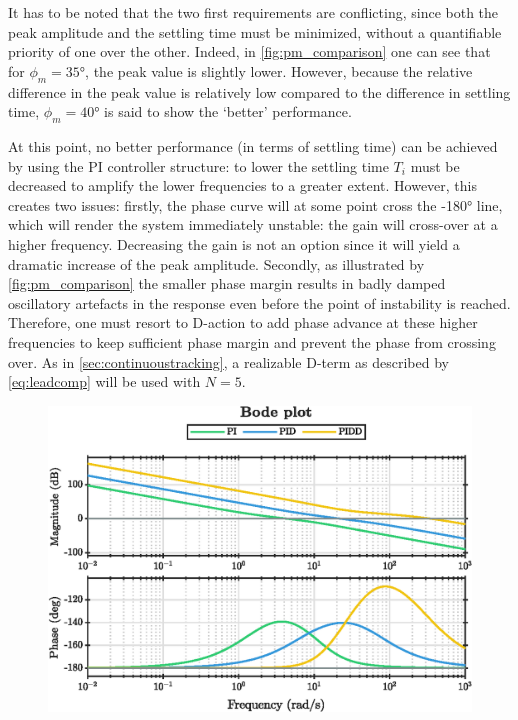 It has to be noted that the two first requirements are conflicting, since both the peak amplitude and the settling time must be minimized, without a quantifiable priority of one over the other. Indeed, in \cref{fig:pm_comparison} one can see that for $\phi_m = \ang{35}$, the peak value is slightly lower. However, because the relative difference in the peak value is relatively low compared to the difference in settling time, $\phi_m = \ang{40}$ is said to show the `better' performance.

At this point, no better performance (in terms of settling time) can be achieved by using the PI controller structure: to lower the settling time $T_i$ must be decreased to amplify the lower frequencies to a greater extent. However, this creates two issues: firstly, the phase curve will at some point cross the \ang{-180} line, which will render the system immediately unstable: the gain will cross-over at a higher frequency. Decreasing the gain is not an option since it will yield a dramatic increase of the peak amplitude. Secondly, as illustrated by \cref{fig:pm_comparison} the smaller phase margin results in badly damped oscillatory artefacts in the response even before the point of instability is reached. Therefore, one must resort to D-action to add phase advance at these higher frequencies to keep sufficient phase margin and prevent the phase from crossing over. As in \cref{sec:continuoustracking}, a realizable D-term as described by \cref{eq:leadcomp} will be used with $N = 5$. 
\begin{figure}[ht]
    \centering
    \includegraphics[]{media/q2/pi_bode_comparison.eps}
    \caption{}
    \label{fig:q2_bode_comparison}
\end{figure}
